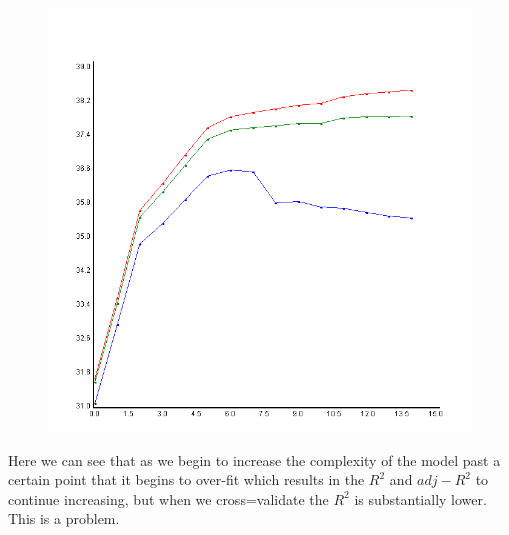 \documentclass{article}
\begin{document}
\begin{figure}
\begin{center}
		
		\includegraphics[scale=0.25]{../plots/Wine/Scala/QuadraticRegressionStepReg.png}
	\end{center}
	\end{figure}

	Here we can see that as we begin to increase the complexity of the model past a certain 
	point that it begins to over-fit which results in the $R^2$ and $adj-R^2$ to continue 
	increasing, but when we cross=validate the $R^2$ is substantially lower. This is a 
	problem. 
\end{document}

